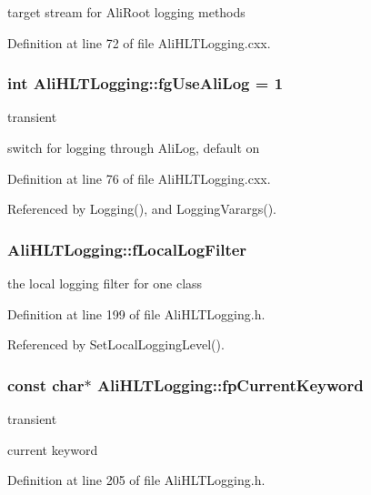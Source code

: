 target stream for Ali\-Root logging methods 

Definition at line 72 of file Ali\-HLTLogging.cxx.
\subsubsection{\setlength{\rightskip}{0pt plus 5cm}int {\bf Ali\-HLTLogging::fg\-Use\-Ali\-Log} = 1\hspace{0.3cm}{\tt  [static, private]}}\label{classAliHLTLogging_v2}


transient 

switch for logging through Ali\-Log, default on 

Definition at line 76 of file Ali\-HLTLogging.cxx.

Referenced by Logging(), and Logging\-Varargs().
\subsubsection{ {\bf Ali\-HLTLogging::f\-Local\-Log\-Filter}\hspace{0.3cm}{\tt  [private]}}\label{classAliHLTLogging_r0}


the local logging filter for one class 

Definition at line 199 of file Ali\-HLTLogging.h.

Referenced by Set\-Local\-Logging\-Level().
\subsubsection{\setlength{\rightskip}{0pt plus 5cm}const char$\ast$ {\bf Ali\-HLTLogging::fp\-Current\-Keyword}\hspace{0.3cm}{\tt  [private]}}\label{classAliHLTLogging_r2}


transient 

current keyword 

Definition at line 205 of file Ali\-HLTLogging.h.

